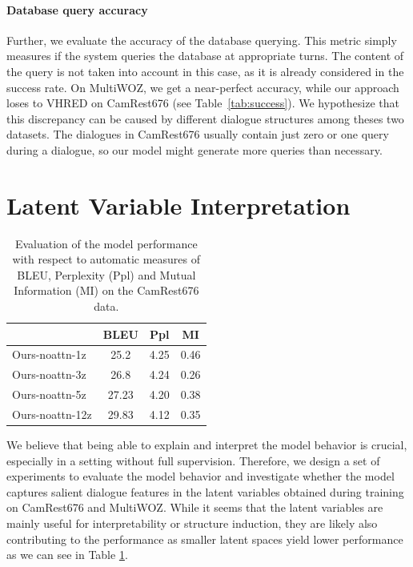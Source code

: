 \paragraph{Database query accuracy}
Further, we evaluate the accuracy of the database querying.
This metric simply measures if the system queries the database at appropriate turns.
The content of the query is not taken into account in this case, as it is already considered in the success rate. On MultiWOZ, we get a near-perfect accuracy, while our approach loses to VHRED on CamRest676 (see Table~\ref{tab:success}).
We hypothesize that this discrepancy can be caused by different dialogue structures among theses two datasets. The dialogues in CamRest676 usually contain just zero or one query during a dialogue, so our model might generate more queries than necessary.

\section{Latent Variable Interpretation}
\label{sec:latents}
\begin{table}[h]
    \centering\small
    \begin{tabular}{l|ccc}
      \toprule
      & BLEU & Ppl & MI  \\
    \midrule
    Ours-noattn-1z  & 25.2 & 4.25 & 0.46  \\
    Ours-noattn-3z  & 26.8 & 4.24 & 0.26  \\
    Ours-noattn-5z  & 27.23 & 4.20 & 0.38  \\
    Ours-noattn-12z  & 29.83 & 4.12 & 0.35  \\    

    \bottomrule
  \end{tabular}
  \caption{Evaluation of the model performance with respect to automatic measures of BLEU, Perplexity (Ppl) and Mutual Information (MI) on the CamRest676 data.}
  \label{04:z_counts}
\end{table}
We believe that being able to explain and interpret the model behavior is crucial, especially in a setting without full supervision.
Therefore, we design a set of experiments to evaluate the model behavior and investigate whether the model captures salient dialogue features in the latent variables obtained during training on CamRest676 and MultiWOZ.
While it seems that the latent variables are mainly useful for interpretability or structure induction, they are likely also contributing to the performance as smaller latent spaces yield lower performance as we can see in Table \ref{04:z_counts}.

